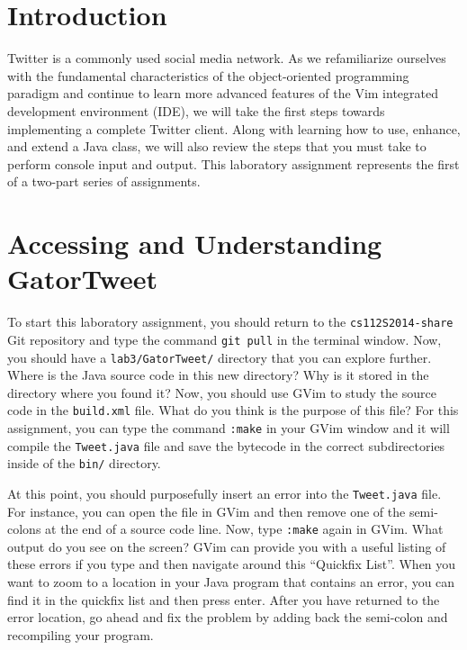 


\usepackage[compact]{titlesec}


\section*{Introduction}

  Twitter is a commonly used social media network.  As we refamiliarize ourselves with the fundamental characteristics
  of the object-oriented programming paradigm and continue to learn more advanced features of the Vim integrated
  development environment (IDE), we will take the first steps towards implementing a complete Twitter client. Along with
  learning how to use, enhance, and extend a Java class, we will also review the steps that you must take to perform
  console input and output. This laboratory assignment represents the first of a two-part series of assignments. 

\section*{Accessing and Understanding GatorTweet}

  To start this laboratory assignment, you should return to the {\tt cs112S2014-share} Git repository and type the
  command {\tt git pull} in the terminal window.  Now, you should have a {\tt lab3/GatorTweet/} directory that you can
  explore further.  Where is the Java source code in this new directory? Why is it stored in the directory where you
  found it? Now, you should use GVim to study the source code in the {\tt build.xml} file.  What do you think is the
  purpose of this file? For this assignment, you can type the command {\tt :make} in your GVim window and it will
  compile the {\tt Tweet.java} file and save the bytecode in the correct subdirectories inside of the {\tt bin/}
  directory. 

  At this point, you should purposefully insert an error into the {\tt Tweet.java} file.  For instance, you can open the
  file in GVim and then remove one of the semi-colons at the end of a source code line. Now, type {\tt :make} again in
  GVim.  What output do you see on the screen? GVim can provide you with a useful listing of these errors if you type
  {\tt <,q>} and then navigate around this ``Quickfix List''. When you want to zoom to a location in your Java program
  that contains an error, you can find it in the quickfix list and then press enter.  After you have returned to the
  error location, go ahead and fix the problem by adding back the semi-colon and recompiling your program. 

